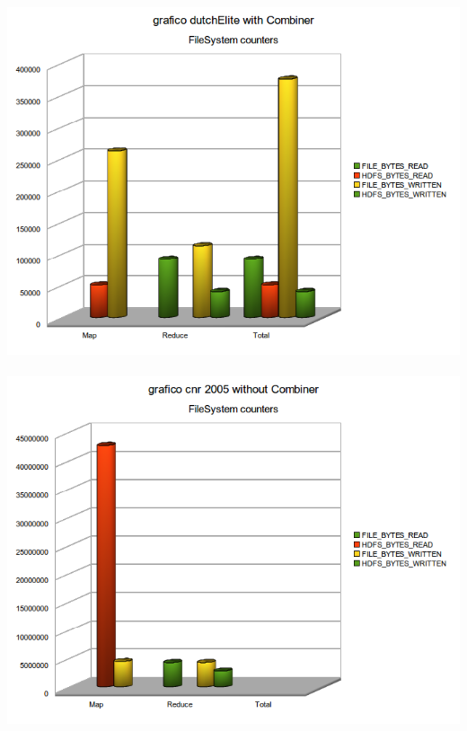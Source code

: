 \documentclass[a4paper,11pt]{report}
\begin{document}
\paragraph{}
\centerline{\includegraphics[width=150mm]{images/grafici/deCombFS.png}}
\paragraph{}
\centerline{\includegraphics[width=150mm]{images/grafici/cnrFS.png}}
\end{document}
